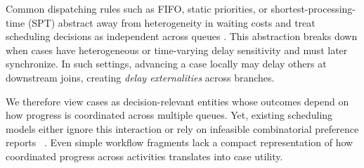 \documentclass[letterpaper]{article}
\begin{document}
Common dispatching rules such as FIFO, static priorities, or shortest-processing-time (SPT) abstract away from heterogeneity in waiting costs and treat scheduling decisions as independent across queues \citep{pinedo2016scheduling,harcholbalter2013performance}. 
This abstraction breaks down when cases have heterogeneous or time-varying delay sensitivity and must later synchronize. In such settings, advancing a case locally may delay others at downstream joins, creating \emph{delay externalities} across branches. 

We therefore view cases as decision-relevant entities whose outcomes depend on how progress is coordinated across multiple queues.
Yet, existing scheduling models either ignore this interaction or rely on infeasible combinatorial preference reports ~\citep{conitzer2006computational,dobzinski2016breaking}.
Even simple workflow fragments lack a compact 
representation of how coordinated progress across activities translates into case utility.
\end{document}

